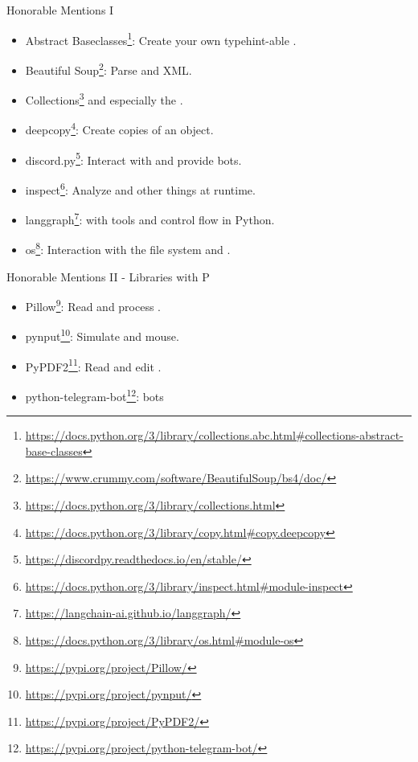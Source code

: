 \documentclass[12pt, aspectratio=169, usepdftitle=false]{beamer}
\newcommand{\furl}[1]{\footnote{\url{#1}}}
\begin{document}
\begin{frame}[fragile]{Honorable Mentions I}
	\begin{itemize}
		\item Abstract Baseclasses\furl{https://docs.python.org/3/library/collections.abc.html\#collections-abstract-base-classes}: Create your own typehint-able .
		
		\item Beautiful Soup\furl{https://www.crummy.com/software/BeautifulSoup/bs4/doc/}: Parse  and XML.
		
		\item Collections\furl{https://docs.python.org/3/library/collections.html} and especially the .
		
		\item deepcopy\furl{https://docs.python.org/3/library/copy.html\#copy.deepcopy}: Create  copies of an object.
		
		\item discord.py\furl{https://discordpy.readthedocs.io/en/stable/}: Interact with  and provide bots.
		
		\item inspect\furl{https://docs.python.org/3/library/inspect.html\#module-inspect}: Analyze  and other things at runtime.
		
		\item langgraph\furl{https://langchain-ai.github.io/langgraph/}:  with tools and control flow in Python.
		
		\item os\furl{https://docs.python.org/3/library/os.html\#module-os}: Interaction with the file system and .
		
	\end{itemize}
\end{frame}



\begin{frame}[fragile]{Honorable Mentions II - Libraries with P}
	\begin{itemize}
		
		\item Pillow\furl{https://pypi.org/project/Pillow/}: Read and process .
		
		\item pynput\furl{https://pypi.org/project/pynput/}: Simulate  and mouse.
		
		\item PyPDF2\furl{https://pypi.org/project/PyPDF2/}: Read and edit .
		
		\item python-telegram-bot\furl{https://pypi.org/project/python-telegram-bot/}:  bots
		
	\end{itemize}
\end{frame}
\end{document}
